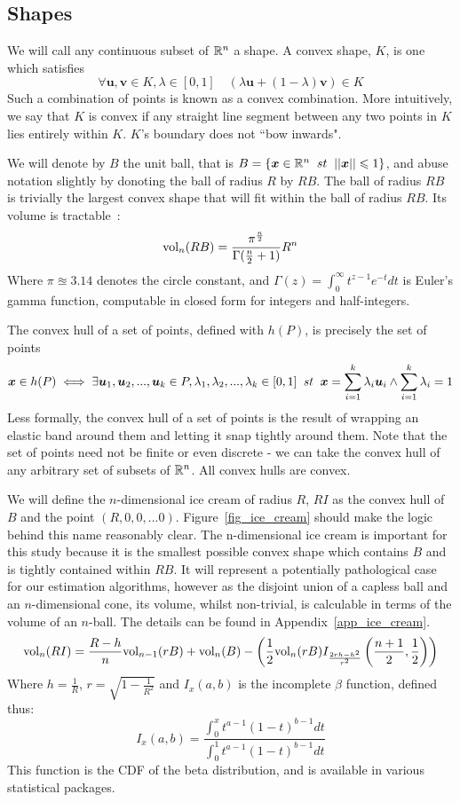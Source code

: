 \subsection{Shapes}

We will call any continuous subset of $\mathbb{R}^{n}$ a shape. A convex shape, $K$, is one which satisfies
$$
\forall \bm{u}, \bm{v} \in K, \lambda \in [0,1] \quad (\lambda \bm{u} + (1-\lambda) \bm{v}) \in K
$$
Such a combination of points is known as a convex combination. More intuitively, we say that $K$ is convex if any straight line segment between any two points in $K$ lies entirely within $K$. $K$'s boundary does not ``bow inwards".

We will denote by $B$ the unit ball, that is $B= \{\bm{x} \in \mathbb{R}^n \;\; st \;\; ||\bm{x}|| \leqslant 1\}$, and abuse notation slightly by donoting the ball of radius $R$ by $RB$. The ball of radius $RB$ is trivially the largest convex shape that will fit within the ball of radius $RB$. Its volume is tractable~\cite{mathworld_ball}:
$$
\mbox{vol}_n(RB) = \frac{\pi^{\frac{n}{2}}}{\Gamma(\frac{n}{2}+1)}R^n
$$
Where $\pi \approxeq 3.14$ denotes the circle constant, and $\Gamma(z) = \int^\infty_0 t^{z-1}e^{-t} dt$ is Euler's gamma function, computable in closed form for integers and half-integers.

The convex hull of a set of points, defined with $h(P)$, is precisely the set of points
$$
\bm{x} \in h(P) \iff \exists \bm{u}_1, \bm{u}_2,...,\bm{u}_k \in P, \lambda_1, \lambda_2, ..., \lambda_k  \in [0,1] \;\; st \;\; \bm{x} = \sum^{k}_{i=1} \lambda_i \bm{u}_i \wedge \sum^{k}_{i=1} \lambda_i = 1
$$
Less formally, the convex hull of a set of points is the result of wrapping an elastic band around them and letting it snap tightly around them. Note that the set of points need not be finite or even discrete - we can take the convex hull of any arbitrary set of subsets of $\mathbb{R}^n$. All convex hulls are convex.

We will define the $n$-dimensional ice cream of radius $R$, $RI$ as the convex hull of $B$ and the point $(R,0,0,...0)$. Figure~\ref{fig_ice_cream} should make the logic behind this name reasonably clear. The n-dimensional ice cream is important for this study because it is the smallest possible convex shape which contains $B$ and is tightly contained within $RB$. It will represent a potentially pathological case for our estimation algorithms, however as the disjoint union of a capless ball and an $n$-dimensional cone, its volume, whilst non-trivial, is calculable in terms of the volume of an $n$-ball. The details can be found in Appendix~\ref{app_ice_cream}.
$$
\mbox{vol}_n(RI) = \frac{R-h}{n} \mbox{vol}_{n-1}(rB) + \mbox{vol}_n(B) - \left(\frac{1}{2}\mbox{vol}_n(rB) I_{\frac{2rh-h^2}{r^2}}\left(\frac{n+1}{2}, \frac{1}{2}\right)\right)
$$
Where $h = \frac{1}{R}$, $r = \sqrt{1-\frac{1}{R^2}}$ and $I_x(a,b)$ is the incomplete $\beta$ function, defined thus:
$$
I_x(a,b) = \frac{\int^x_0 t^{a-1}(1-t)^{b-1}dt}{\int^1_0 t^{a-1}(1-t)^{b-1} dt}
$$
This function is the CDF of the beta distribution, and is available in various statistical packages.

